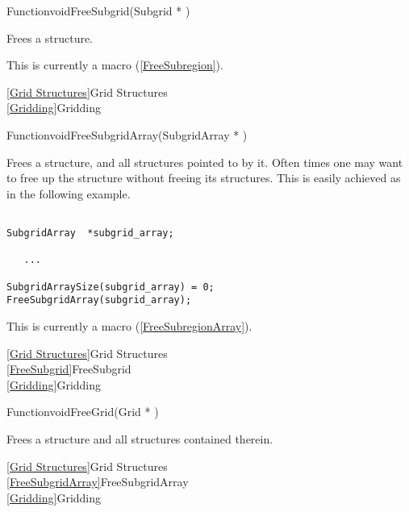 {\newpage\clearpage
{}%
\begin{deftypefn}
{Function}{void}{FreeSubgrid}({Subgrid *} )
\par
\DESCRIPTION
Frees a  structure.
\par
\NOTES
This is currently a macro (\ref{FreeSubregion}).
\par
\SEEALSO
\vref{Grid Structures}{Grid Structures}\\
\vref{Gridding}{Gridding}
\par
\end{deftypefn}%
\lthtmlfigureZ
\lthtmlcheckvsize\clearpage}

{\newpage\clearpage
{}%
\begin{deftypefn}
{Function}{void}{FreeSubgridArray}({SubgridArray *} )
\par
\DESCRIPTION
Frees a  structure, and all 
structures pointed to by it.
Often times one may want to free up the  structure
without freeing its  structures.
This is easily achieved as in the following example.
\par
\EXAMPLE
\mbox{}
\begin{display}\begin{verbatim}

SubgridArray  *subgrid_array;

   ...

SubgridArraySize(subgrid_array) = 0;
FreeSubgridArray(subgrid_array);\end{verbatim}
\end{display}
\par
\NOTES
This is currently a macro (\ref{FreeSubregionArray}).
\par
\SEEALSO
\vref{Grid Structures}{Grid Structures}\\
\vref{FreeSubgrid}{FreeSubgrid}\\
\vref{Gridding}{Gridding}
\par
\end{deftypefn}%
\lthtmlfigureZ
\lthtmlcheckvsize\clearpage}

{\newpage\clearpage
{}%
\begin{deftypefn}{Function}{void}{FreeGrid}({Grid *} )
\par
\DESCRIPTION
Frees a  structure and all structures contained therein.
\par
\SEEALSO
\vref{Grid Structures}{Grid Structures}\\
\vref{FreeSubgridArray}{FreeSubgridArray}\\
\vref{Gridding}{Gridding}
\par
\end{deftypefn}%
\lthtmlfigureZ
\lthtmlcheckvsize\clearpage}


